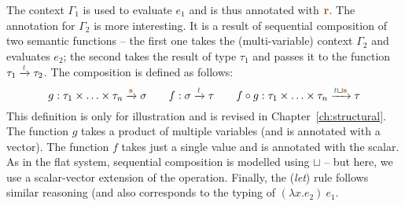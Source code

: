 The context $\Gamma_1$ is used to evaluate $e_1$ and is thus annotated with $\aclrd{\mathbf{r}}$. 
The annotation for $\Gamma_2$ is more interesting. It is a result of sequential composition of two
semantic functions -- the first one takes the (multi-variable) context $\Gamma_2$ and evaluates 
$e_2$; the second takes the result of type $\tau_1$ and passes it to the function $\tau_1 \xrightarrow{\cclrd{t}} \tau_2$.
The composition is defined as follows:
%
\begin{equation*}
g : \tau_1 \times \ldots \times \tau_n \xrightarrow{\aclrd{\mathbf{s}}} \sigma
\qquad
f : \sigma \xrightarrow{\cclrd{t}} \tau
\qquad
f \circ g : \tau_1 \times \ldots \times \tau_n \xrightarrow{\cclrd{t} \sqcup \aclrd{\mathbf{s}}} \tau
\end{equation*}
%
This definition is only for illustration and is revised in Chapter~\ref{ch:structural}. The function
$g$ takes a product of multiple variables (and is annotated with a vector). The function $f$ takes
just a single value and is annotated with the scalar. As in the flat system, sequential composition
is modelled using $\sqcup$ -- but here, we use a scalar-vector extension of the operation. Finally,
the (\emph{let}) rule follows similar reasoning (and also corresponds to the typing of $(\lambda x.e_2)~e_1$.


